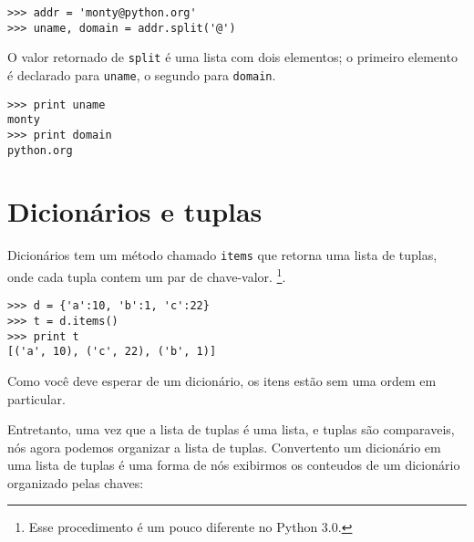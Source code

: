 
\beforeverb
\begin{verbatim}
>>> addr = 'monty@python.org'
>>> uname, domain = addr.split('@')
\end{verbatim}
\afterverb
%
O valor retornado de {\tt split} é uma lista com dois elementos;
o primeiro elemento é declarado para {\tt uname}, o segundo para
{\tt domain}.

\beforeverb
\begin{verbatim}
>>> print uname
monty
>>> print domain
python.org
\end{verbatim}
\afterverb
%

\section{Dicionários e tuplas}


Dicionários tem um método chamado {\tt items} que retorna uma lista de
tuplas, onde cada tupla contem um par de chave-valor.
\footnote{Esse procedimento é um pouco diferente no Python 3.0.}.

\beforeverb
\begin{verbatim}
>>> d = {'a':10, 'b':1, 'c':22}
>>> t = d.items()
>>> print t
[('a', 10), ('c', 22), ('b', 1)]
\end{verbatim}
\afterverb
%
Como você deve esperar de um dicionário, os itens estão sem
uma ordem em particular.

Entretanto, uma vez que a lista de tuplas é uma lista, e tuplas são comparaveis,
nós agora podemos organizar a lista de tuplas. Convertento um dicionário
em uma lista de tuplas é uma forma de nós exibirmos os conteudos de um
dicionário organizado pelas chaves:

